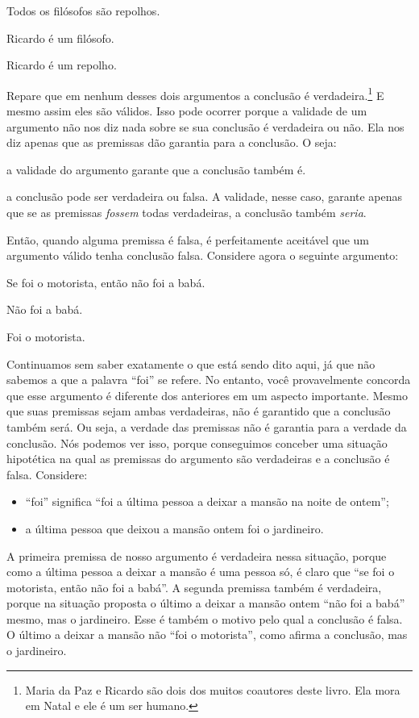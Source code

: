 \begin{earg}
	\item[] Todos os filósofos são repolhos.
	\item[] Ricardo é um filósofo.
	\item[\therefore] Ricardo é um repolho.
\end{earg}
Repare que em nenhum desses dois argumentos a conclusão é verdadeira.\footnote{
	Maria da Paz e Ricardo são dois dos muitos coautores deste livro. Ela mora em Natal e ele é um ser humano.}
E mesmo assim eles são válidos.
Isso pode ocorrer porque a validade de um argumento não nos diz nada sobre se sua conclusão é verdadeira ou não. 
Ela nos diz apenas que as premissas dão garantia para a conclusão.
O seja:
\begin{description}\label{premissafalsa}
	\item[Quando as premissas \textit{são} todas verdadeiras:] a validade do argumento garante que a conclusão também é.
	\item[Quando as premissas \textit{não são} todas verdadeiras:] a conclusão pode ser verdadeira ou falsa.
	A validade, nesse caso, garante apenas que se as premissas \textit{fossem} todas verdadeiras, a conclusão também \textit{seria}.
\end{description}
Então, quando alguma premissa é falsa, é perfeitamente aceitável que um argumento válido tenha conclusão falsa.
Considere agora o seguinte argumento:
\begin{earg}\label{argMaidDriver}
	\item[] Se foi o motorista, então não foi a babá.
	\item[] Não foi a babá.
	\item[\therefore] Foi o motorista.
\end{earg}
Continuamos sem saber exatamente o que está sendo dito aqui, já que não sabemos a que a palavra ``foi'' se refere.
No entanto, você provavelmente concorda que esse argumento é diferente dos anteriores em um aspecto importante.
Mesmo que suas premissas sejam ambas verdadeiras, não é garantido que a conclusão também será.
Ou seja, a verdade das premissas não é garantia para a verdade da conclusão.
Nós podemos ver isso, porque conseguimos conceber uma situação hipotética na qual as premissas do argumento são verdadeiras e a conclusão é falsa.
Considere:

\begin{itemize}\label{contraexemplo}
	\item ``foi'' significa ``foi a última pessoa a deixar a mansão na noite de ontem'';
	\item  a última pessoa que deixou a mansão ontem foi o jardineiro.
\end {itemize}
A primeira premissa de nosso argumento é verdadeira nessa situação, porque como a última pessoa a deixar a mansão é uma pessoa só, é claro que ``se foi o motorista, então não foi a babá''.
A segunda premissa também é verdadeira, porque na situação proposta o último a deixar a mansão ontem ``não foi a babá'' mesmo, mas o jardineiro.
Esse é também o motivo pelo qual a  conclusão é falsa.
O último a deixar a mansão não ``foi o motorista'', como afirma a conclusão, mas o jardineiro.

